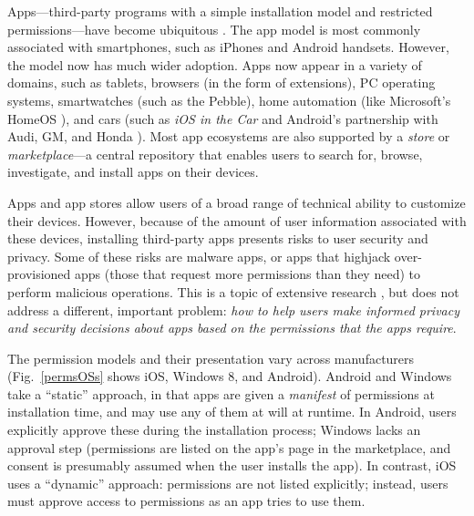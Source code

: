 \documentclass[11pt]{article}
\begin{document}
Apps---third-party programs with a simple installation model and
restricted permissions---have become ubiquitous 
\cite{gplay-50-billion, apple-50-billion}.
The app model is most commonly associated with smartphones, 
such as iPhones and Android handsets. However, the model now has much 
wider adoption. Apps now appear in a variety of domains,
such as tablets, browsers (in the form of extensions), PC operating 
systems, smartwatches (such as the Pebble), 
home automation (like Microsoft's HomeOS \cite{ms-homeos}),
and cars (such as \emph{iOS in the Car} \cite{cars-apple} and Android's 
partnership with Audi, GM, and Honda \cite{cars-google}).
Most app ecosystems are also supported by a \emph{store} or
\emph{marketplace}---a central repository that
enables users to search for, browse,
investigate, and install apps on their devices. 

Apps and app stores allow users of a broad range
of technical ability to customize their devices.
However,  
because of the amount of user information associated with these 
devices, installing third-party apps presents 
risks to user security and privacy. 
Some of these risks are malware apps, or apps that highjack
over-provisioned apps (those that request more permissions than they need)
to perform malicious operations. This is a topic
of extensive research 
\cite{droidrisk-2013, android-repackaged-CODASPY12, comDroid-MOBISYS11}, 
but does not address a different,
important problem: \emph{how to help users make informed privacy and
  security decisions about apps based on the permissions that the apps
  require}.

The permission models and their presentation vary across manufacturers
(Fig.~\ref{permsOSs} shows iOS, Windows 8, and Android). Android and
Windows take a ``static'' approach, in that apps are given a
\emph{manifest} of
permissions at installation time, and may use any of them at will at runtime. In
Android, users explicitly approve these during the installation
process; Windows lacks an approval step (permissions are listed on the
app's page in the marketplace, and consent is presumably assumed when
the user installs the app). In contrast, iOS uses a ``dynamic''
approach: permissions are not listed explicitly; instead, users must
approve access to permissions as an app tries to use them.
\end{document}
